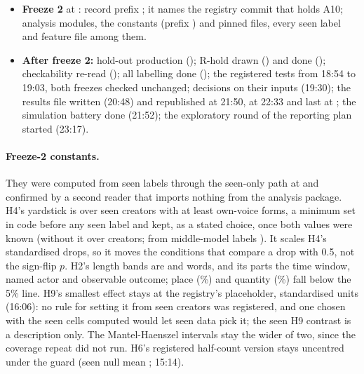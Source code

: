 \begin{itemize}
\FixtureRequests{} requests unchanged; the first record kept); A10 entered at \ATenStamp{} (draft prefix
\ATenShaPrefix).
\item \textbf{Freeze 2} at \FreezeTwoStamp: record prefix \FreezeTwoPrefix; it names the registry commit that holds
A10; \FreezeTwoModules{} analysis modules, the constants (prefix \ConstantsPrefix) and \FreezeTwoPinned{} pinned files,
every seen label and feature file among them.
\item \textbf{After freeze 2:} hold-out production (\HoldoutProdStamp); R-hold drawn (\RholdDrawnStamp) and done
(\RholdDoneStamp); checkability re-read (\ChkHoldoutStamp); all labelling done (\LabellingDoneStamp); the registered
tests from 18:54 to 19:03, both freezes checked unchanged; decisions on their inputs (19:30); the results file written
(20:48) and republished at 21:50, at 22:33 and last at \ResStamp; the simulation battery done (21:52); the exploratory
round of the reporting plan started (23:17).
\end{itemize}

\paragraph{Freeze-2 constants.} They were computed from seen labels through the seen-only path at \ConstantsStamp{} and
confirmed by a second reader that imports nothing from the analysis package. H4's yardstick is \HFourYardstick{} over
\HFourYardstickCreators{} seen creators with at least \HFourMinForms{} own-voice forms, a minimum set in code before any
seen label and kept, as a stated choice, once both values were known (without it \HFourYardstickNoMin{} over
\HFourYardstickNoMinCreators{} creators; from middle-model labels \HFourYardstickMiddle). It scales H4's standardised
drops, so it moves the conditions that compare a drop with 0.5, not the sign-flip $p$. H2's length bands are
\HTwoBandLo{} and \HTwoBandHi{} words, and its parts the time window, named actor and observable outcome; place
(\HTwoPlacePct\%) and quantity (\HTwoQuantityPct\%) fall below the 5\% line. H9's smallest effect stays at the
registry's placeholder, \HNineSesoi{} standardised units (16:06): no rule for setting it from seen creators was
registered, and one chosen with the seen cells computed would let seen data pick it; the seen H9 contrast is a
description only. The Mantel-Haenszel intervals stay the wider of two, since the coverage repeat did not run. H6's
registered half-count version stays uncentred under the guard (seen null mean \HSixRegNullMean; 15:14).

